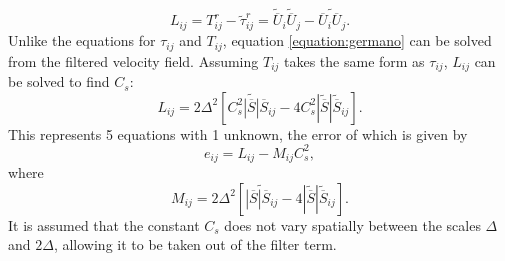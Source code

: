 \documentclass[12pt,oneside,a4paper]{article}
\newcommand{\vecti}[1]{{#1}_{i}}
\newcommand{\vectj}[1]{{#1}_{j}}
\newcommand{\matij}[1]{{#1}_{ij}}
\begin{document}
\begin{equation}
\label{equation:germano}
\matij{L} = \matij{T}^r - \matij{\widetilde{\tau}}^r = \vecti{\widetilde{\overline{U}}}\vectj{\widetilde{\overline{U}}} - \widetilde{\vecti{\overline{U}}\vectj{\overline{U}}}.
\end{equation}
Unlike the equations for $\tau_{ij}$ and $T_{ij}$, equation \ref{equation:germano} can be solved from the filtered velocity field.  Assuming $\matij{T}$ takes the same form as $\matij{\tau}$, $L_{ij}$ can be solved to find $C_s$:
\begin{equation}
L_{ij} = 2\Delta^2 \left[	\widetilde{C_s^2 |\overline{S} | \matij{\overline{S}}} - 4 C_s^2 |\widetilde{\overline{S}}| \matij{\widetilde{\overline{S}}}		 \right].
\end{equation}
This represents 5 equations with 1 unknown, the error of which is given by
\begin{equation}
\label{equation:CsError}
e_{ij} = 	L_{ij} - M_{ij}C_s^2			,
\end{equation}
where $$M_{ij} =  2\Delta^2 \left[	\widetilde{|\overline{S} | \matij{\overline{S}}} - 4 |\widetilde{\overline{S}}| \matij{\widetilde{\overline{S}}} \right].$$
It is assumed that the constant $C_s$ does not vary spatially between the scales $\Delta$ and $2\Delta$, allowing it to be taken out of the filter term.
\end{document}

